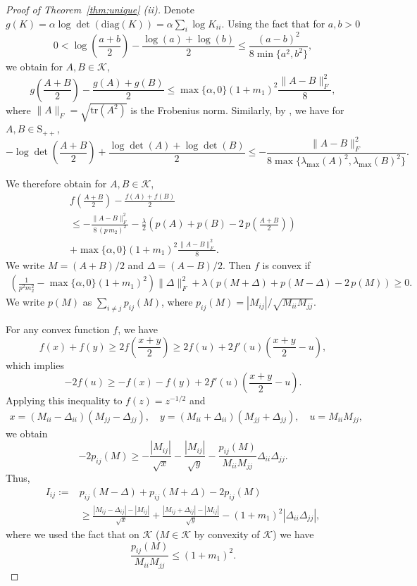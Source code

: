 \documentclass[12pt]{amsart}
\numberwithin{equation}{section}
\numberwithin{equation}{section}
\theoremstyle{plain}
\theoremstyle{definition}
\newcommand{\tr}{\mathrm{tr}}
\newcommand{\diag}[1]{\mathrm{diag}(#1)}
\newcommand{\Spp}{\mathrm{S}_{++}}
\begin{document}
\begin{proof}[Proof of Theorem~\ref{thm:unique} (ii)]
Denote $g(K) = \alpha\log\det(\diag{K}) = \alpha\sum_{i} \log K_{ii}$.  Using the fact that for $a,b>0$
\[
0<\log\left(\frac{a+b}{2}\right)-\frac{\log(a)+\log(b)}{2}\leq \frac{(a-b)^2}{8\min\{a^2,b^2\}}, 
\]
we obtain for $A,B\in\mathcal{K}$,
\[
g\left(\frac{A+B}{2}\right) - \frac{g(A)+g(B)}{2} \leq \max\{\alpha,0\} (1+m_1)^2 \frac{\|A-B\|_F^2}{8},
\]
where $\|A\|_F = \sqrt{\tr(A^2)}$ is the Frobenius norm. 
Similarly, by \cite[Lemma 15]{INEQ}, we have for $A,B\in\Spp$,
\[
-\log\det\left(\frac{A+B}{2}\right) + \frac{\log\det(A)+\log\det(B)}{2}\leq -\frac{\|A-B\|_F^2}{8\max\{\lambda_{\max}(A)^2,\lambda_{\max}(B)^2\}}.
\]

We therefore obtain for $A,B\in\mathcal{K}$,
\begin{multline*}
    f\left( \frac{A+B}{2}\right)- \frac{f(A)+f(B)}{2} \\
    \leq -\frac{\|A-B\|_F^2}{8\, (p\, m_2)^2} - \frac{\lambda}{2} \left(p(A)+p(B)-2\, p\left(\frac{A+B}{2}\right)\right) \\
    + \max\{\alpha,0\}(1+m_1)^2\frac{\|A-B\|_F^2}{8}.
\end{multline*}
We write $M=(A+B)/2$ and $\Delta = (A-B)/2$. Then $f$ is convex if 
\begin{align}\label{eq:concavef}
\left(\frac{1}{p^2 m_2^2} - \max\{\alpha,0\}(1+m_1)^2 \right)\|\Delta\|_F^2 + \lambda\left(p(M+\Delta)+p(M-\Delta)-2\, p\left(M\right)\right)\geq 0.
\end{align}
We write $p(M)$ as $\sum_{i\neq j} p_{ij}(M)$, where
$p_{ij}(M) = |M_{ij}|/\sqrt{M_{ii}M_{jj}}$. 

For any convex function $f$, we have 
\[
f(x)+f(y)\geq 2 f\left(\frac{x+y}{2}\right)\geq 2 f(u)+2 f'(u)\left(\frac{x+y}{2}-u\right),
\]
which implies 
\[
-2 f(u) \geq -f(x)-f(y) +2 f'(u)\left(\frac{x+y}{2}-u\right).
\]
Applying this inequality to $f(z)=z^{-1/2}$ and 
\begin{gather*}
    x=(M_{ii}-\Delta_{ii})(M_{jj}-\Delta_{jj}),\quad y=(M_{ii}+\Delta_{ii})(M_{jj}+\Delta_{jj}), \quad 
    u = M_{ii} M_{jj},
\end{gather*}
we obtain
\[
-2 p_{ij}(M) \geq -\frac{|M_{ij}|}{\sqrt{x}} - \frac{|M_{ij}|}{\sqrt{y}} - \frac{p_{ij}(M)}{M_{ii}M_{jj}}\Delta_{ii}\Delta_{jj}.
\]
Thus,
\begin{align*}
 I_{ij}:=&   p_{ij}(M-\Delta)+p_{ij}(M+\Delta)-2p_{ij}(M) \\
        &\geq
    \frac{|M_{ij}-\Delta_{ij}|-|M_{ij}|}{\sqrt{x}} + \frac{|M_{ij}+\Delta_{ij}|-|M_{ij}|}{\sqrt{y}}-(1+m_1)^2|\Delta_{ii}\Delta_{jj}|,
\end{align*}
where we used the fact that on $\mathcal{K}$ ($M\in\mathcal{K}$ by convexity of $\mathcal{K}$) we have 
\[
\frac{p_{ij}(M)}{M_{ii}M_{jj}} \leq (1+m_1)^2.
\]


\end{proof}
\end{document}
